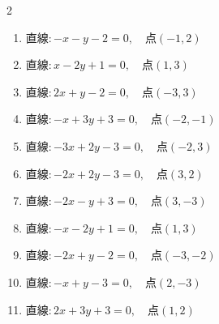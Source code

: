 \begin{multicols}{2}
\begin{enumerate}

  \item $直線:-x-y-2=0,\quad 点 ( -1, 2 )$


  \item $直線:x-2y+1=0,\quad 点 ( 1, 3 )$


  \item $直線:2x+y-2=0,\quad 点 ( -3, 3 )$


  \item $直線:-x+3y+3=0,\quad 点 ( -2, -1 )$


  \item $直線:-3x+2y-3=0,\quad 点 ( -2, 3 )$


  \item $直線:-2x+2y-3=0,\quad 点 ( 3, 2 )$


  \item $直線:-2x-y+3=0,\quad 点 ( 3, -3 )$

        \phantom{$\displaystyle 距離 : 0$}

\columnbreak %

\resetques

  \item $直線:-x-2y+1=0,\quad 点 ( 1, 3 )$


  \item $直線:-2x+y-2=0,\quad 点 ( -3, -2 )$


  \item $直線:-x+y-3=0,\quad 点 ( 2, -3 )$


  \item $直線:2x+3y+3=0,\quad 点 ( 1, 2 )$



\end{enumerate}
\end{multicols}

